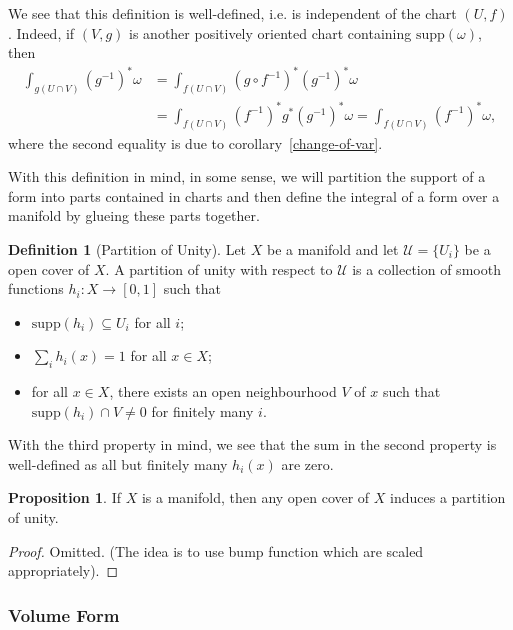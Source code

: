 \documentclass[]{article}
\theoremstyle{definition}
\theoremstyle{definition}
\newtheorem{definition}{Definition}[section]
\newtheorem{proposition}{Proposition}[section]
\begin{document}
We see that this definition is well-defined, i.e. is independent of the chart 
\((U, f)\). Indeed, if \((V, g)\) is another positively oriented chart containing 
\(\text{supp}(\omega)\), then 
\[\begin{split}
  \int_{g(U \cap V)}(g^{-1})^* \omega & = \int_{f(U \cap V)} (g \circ f^{-1})^*(g^{-1})^* \omega \\
  & = \int_{f(U \cap V)} (f^{-1})^* g^* (g^{-1})^* \omega = \int_{f(U \cap V)} (f^{-1})^* \omega,
\end{split}\]
where the second equality is due to corollary~\ref{change-of-var}.

With this definition in mind, in some sense, we will partition the support of a 
form into parts contained in charts and then define the integral of a form over 
a manifold by glueing these parts together.

\begin{definition}[Partition of Unity]
  Let \(X\) be a manifold and let \(\mathcal{U} = \{U_i\}\) be a open cover of 
  \(X\). A partition of unity with respect to \(\mathcal{U}\) is a collection of 
  smooth functions \(h_i : X \to [0, 1]\) such that 
  \begin{itemize}
    \item \(\text{supp}(h_i) \subseteq U_i\) for all \(i\);
    \item \(\sum_i h_i(x) = 1\) for all \(x \in X\);
    \item for all \(x \in X\), there exists an open neighbourhood \(V\) of \(x\) 
      such that \(\text{supp}(h_i) \cap V \neq 0\) for finitely many \(i\).
  \end{itemize}
  With the third property in mind, we see that the sum in the second property is 
  well-defined as all but finitely many \(h_i(x)\) are zero.
\end{definition}

\begin{proposition}
  If \(X\) is a manifold, then any open cover of \(X\) induces a partition of 
  unity.
\end{proposition}
\begin{proof}
  Omitted. (The idea is to use bump function which are scaled appropriately).
\end{proof}

\subsubsection{Volume Form}
\end{document}
